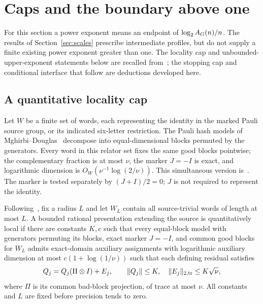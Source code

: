 \section{Caps and the boundary above one}\label{sec:boundaries}
For this section a power exponent means an endpoint of $\log_2 A_G(n)/n$. The results of Section~\ref{sec:scales} prescribe intermediate profiles, but do not supply a finite existing power exponent greater than one. The locality cap and unbounded-upper-exponent statements below are recalled from~\cite{UP}; the stopping cap and conditional interface that follow are deductions developed here.

\subsection{A quantitative locality cap}
Let $W$ be a finite set of words, each representing the identity in the marked Pauli source group, or its indicated six-letter restriction. The Pauli hash models of Mghirbi--Douglas~\cite[Proposition 9.4]{Game} decompose into equal-dimensional blocks permuted by the generators. Every word in this relator set fixes the same good blocks pointwise; the complementary fraction is at most $\nu$, the marker $J=-I$ is exact, and logarithmic dimension is $O_W(\nu^{-1}\log(2/\nu))$. This simultaneous version is~\cite[Lemma P6.6]{UP}. The marker is tested separately by $(J+I)/2=0$; $J$ is not required to represent the identity.

\begin{definition}\label{def:local}
Following~\cite[Definition P6.5]{UP}, fix a radius $L$ and let $W_L$ contain all source-trivial words of length at most $L$. A bounded rational presentation extending the source is quantitatively local if there are constants $K,c$ such that every equal-block model with generators permuting its blocks, exact marker $J=-I$, and common good blocks for $W_L$ admits exact-domain auxiliary assignments with logarithmic auxiliary dimension at most $c(1+\log(1/\nu))$ such that each defining residual satisfies
\[
 Q_j=Q_j(\Pi\otimes I)+E_j,\qquad
 \lVert Q_j\rVert\le K,\quad\lVert E_j\rVert_{2,\operatorname{tr}}\le K\sqrt\nu,
\]
where $\Pi$ is its common bad-block projection, of trace at most $\nu$. All constants and $L$ are fixed before precision tends to zero.
\end{definition}

